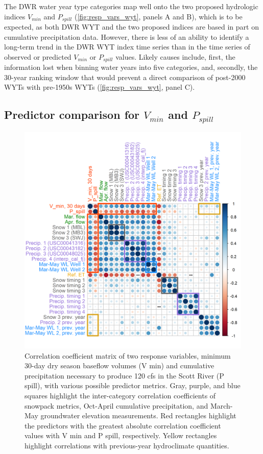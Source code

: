 \documentclass[hess, manuscript]{copernicus}
\begin{document}
The DWR water year type categories map well onto the two proposed
hydrologic indices \(V_{min}\) and \(P_{spill}\)
(\autoref{fig:resp_vars_wyt}, panels A and B), which is to be expected,
as both DWR WYT and the two proposed indices are based in part on
cumulative precipitation data. However, there is less of an ability to
identify a long-term trend in the DWR WYT index time series than in the
time series of observed or predicted \(V_{min}\) or \(P_{spill}\)
values. Likely causes include, first, the information lost when binning
water years into five categories, and, secondly, the 30-year ranking
window that would prevent a direct comparison of post-2000 WYTs with
pre-1950s WYTs (\autoref{fig:resp_vars_wyt}, panel C).

\subsection{\texorpdfstring{Predictor comparison for \(V_{min}\) and
\(P_{spill}\)}{Predictor comparison for V\_\{min\} and P\_\{spill\}}}

\begin{figure}
\includegraphics[width=1\linewidth]{f08} \caption{\label{fig:corr_matrix} Correlation coefficient matrix of two response variables, minimum 30-day dry season baseflow volumes (V min) and cumulative precipitation necessary to produce 120 cfs in the Scott River (P spill), with various possible predictor metrics. Gray, purple, and blue squares highlight the inter-category correlation coefficients of snowpack metrics, Oct-April cumulative precipitation, and March-May groundwater elevation measurements. Red rectangles highlight the predictors with the greatest absolute correlation coefficient values with V min and P spill, respectively. Yellow rectangles highlight correlations with previous-year hydroclimate quantities.}\label{fig:corr_matrix}
\end{figure}
\end{document}
